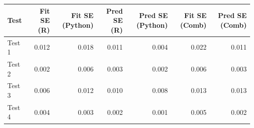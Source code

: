 
\begin{tabular}{l|r|r|r|r|r|r}
\hline
Test & Fit SE (R) & Fit SE (Python) & Pred SE (R) & Pred SE (Python) & Fit SE (Comb) & Pred SE (Comb)\\
\hline
Test 1 & 0.012 & 0.018 & 0.011 & 0.004 & 0.022 & 0.011\\
\hline
Test 2 & 0.002 & 0.006 & 0.003 & 0.002 & 0.006 & 0.003\\
\hline
Test 3 & 0.006 & 0.012 & 0.010 & 0.008 & 0.013 & 0.013\\
\hline
Test 4 & 0.004 & 0.003 & 0.002 & 0.001 & 0.005 & 0.002\\
\hline
\end{tabular}
